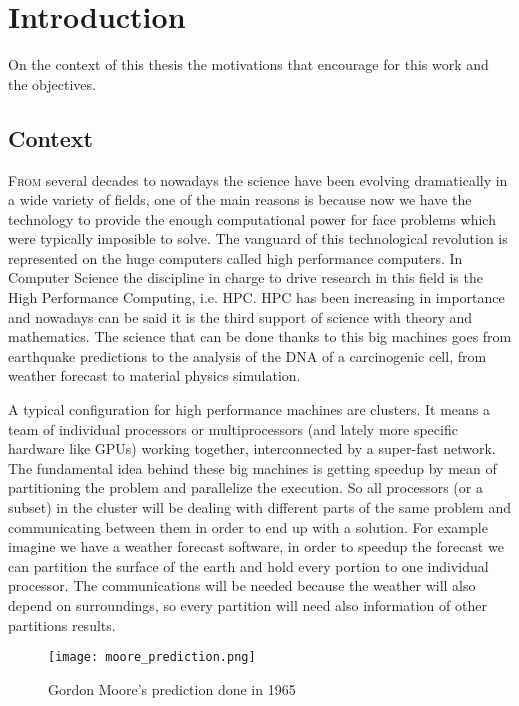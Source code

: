 \chapter{Introduction}

On the context of this thesis the motivations that encourage for this work and
the objectives.

\section{Context}
\lettrine{F}{rom} several decades to nowadays the science have been evolving
dramatically in a wide variety of fields, one of the main reasons is because now we
have the technology to provide the enough computational power for face problems
which were typically imposible to solve. The vanguard of this technological
revolution is represented on the huge computers called high performance
computers.
In Computer Science the discipline in charge to drive research in this field is 
the High Performance Computing, i.e. HPC. HPC has been increasing in importance 
and nowadays can be said it is the third support of science with theory and 
mathematics. The science that can be done thanks to this big machines goes from 
earthquake predictions to the analysis of the DNA of a carcinogenic cell, from
weather forecast to material physics simulation.

A typical configuration for high performance machines are clusters. It means a 
team of individual processors or multiprocessors (and lately more specific 
hardware like GPUs) working together, interconnected by a super-fast network. 
The fundamental idea behind these big machines is getting speedup by mean of
partitioning the problem and parallelize the execution. So all processors (or a 
subset) in the cluster will be dealing with different parts of the same problem 
and communicating between them in order to end up with a solution. For example 
imagine we have a weather forecast software, in order to speedup the forecast 
we can partition the surface of the earth and hold every portion to one individual
processor. The communications will be needed because the weather will also depend 
on surroundings, so every partition will need also information of other partitions 
results.

\begin{figure}
  \caption{Gordon Moore's prediction done in 1965}
  \label{moore-prediction}
  \centering
    \texttt{[image: moore\_prediction.png]}
\end{figure}


